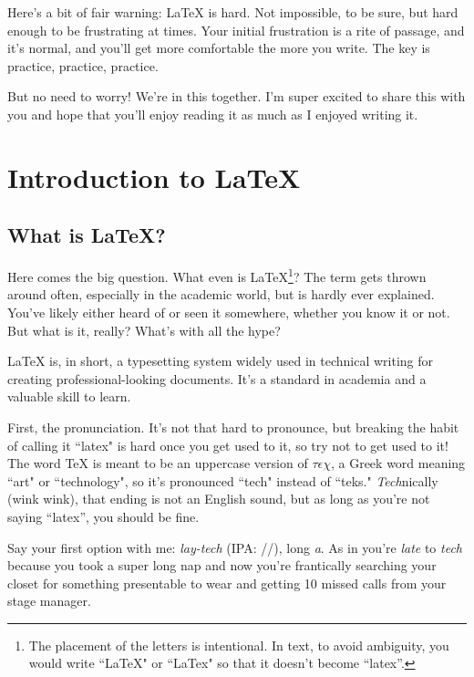 \documentclass[letterpaper, 12pt]{article}
\begin{document}
Here's a bit of fair warning: \LaTeX{} is hard. Not impossible, to be sure, but hard enough to be frustrating at times. Your initial frustration is a rite of passage, and it's normal, and you'll get more comfortable the more you write. The key is practice, practice, practice.

But no need to worry! We're in this together. I'm super excited to share this with you and hope that you'll enjoy reading it as much as I enjoyed writing it.

\newpage

\fancyhead[L]{\nouppercase{\leftmark}}   %
\fancyhead[R]{\nouppercase{\rightmark}}  %
\fancyfoot[C]{\thepage}
\renewcommand{\sectionmark}[1]{
  \markboth{\thesection\ \textsc{#1}}{}}
\renewcommand{\subsectionmark}[1]{
  \markright{\thesubsection\ \textsc{#1}}}

\section{Introduction to \LaTeX}

\subsection{What is \LaTeX?}

Here comes the big question. What even is \LaTeX\footnote{The placement of the letters is intentional. In text, to avoid ambiguity, you would write ``LaTeX" or ``LaTex" so that it doesn't become ``latex''.}? The term gets thrown around often, especially in the academic world, but is hardly ever explained. You've likely either heard of or seen it somewhere, whether you know it or not. But what is it, really? What's with all the hype?

\LaTeX{} is, in short, a typesetting system widely used in technical writing for creating professional-looking documents. It's a standard in academia and a valuable skill to learn.

First, the pronunciation. It's not that hard to pronounce, but breaking the habit of calling it ``latex" is hard once you get used to it, so try not to get used to it! The word \TeX{} is meant to be an uppercase version of $\tau \epsilon \chi$, a Greek word meaning ``art" or ``technology", so it's pronounced ``tech" instead of ``teks." \textit{Tech}nically (wink wink), that ending is not an English sound, but as long as you're not saying ``latex'', you should be fine.

Say your first option with me: \textit{lay-tech} (IPA: //), long \emph{a}. As in you're \textit{late} to \textit{tech} because you took a super long nap and now you're frantically searching your closet for something presentable to wear and getting 10 missed calls from your stage manager.
\end{document}
